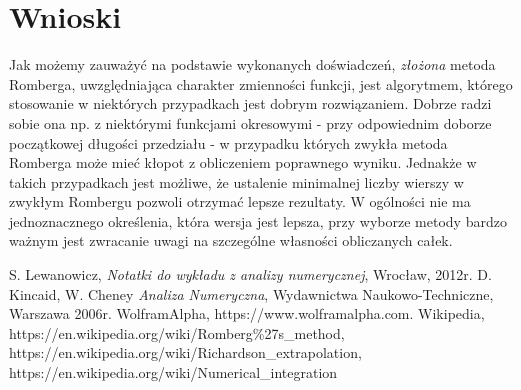 \documentclass[11pt,leqno]{article}
\begin{document}
\section{Wnioski}\label{S:Wnioski}
Jak możemy zauważyć na podstawie wykonanych doświadczeń, \textit{złożona}
metoda Romberga, uwzględniająca charakter zmienności funkcji, jest algorytmem,
którego stosowanie w niektórych przypadkach jest dobrym rozwiązaniem. Dobrze radzi
sobie ona np. z niektórymi funkcjami okresowymi - przy odpowiednim doborze
początkowej długości przedziału - w przypadku których zwykła metoda Romberga może mieć
kłopot z obliczeniem poprawnego wyniku. Jednakże w takich przypadkach jest możliwe,
że ustalenie minimalnej liczby wierszy w zwykłym Rombergu pozwoli otrzymać lepsze
rezultaty. W ogólności nie ma jednoznacznego określenia, która wersja jest lepsza,
przy wyborze metody bardzo ważnym jest zwracanie uwagi na szczególne własności
obliczanych całek.

\thispagestyle{empty}
\begin{thebibliography}{99}
     S. Lewanowicz, \textit{Notatki do wykładu z analizy numerycznej}, Wrocław, 2012r.
     D. Kincaid, W. Cheney \textit{Analiza Numeryczna}, Wydawnictwa Naukowo-Techniczne, Warszawa 2006r.
     WolframAlpha, https://www.wolframalpha.com.
     Wikipedia, https://en.wikipedia.org/wiki/Romberg\%27s\_method, \\https://en.wikipedia.org/wiki/Richardson\_extrapolation, https://en.wikipedia.org/wiki/Numerical\_integration
\end{thebibliography}
\end{document}
